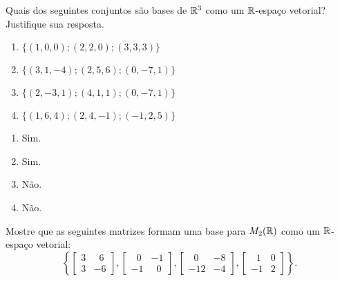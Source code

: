 \documentclass[12pt]{exam}
\begin{document}
    \begin{exercicio}
        Quais dos seguintes conjuntos são bases de $\mathbb{R}^3$ como um $\mathbb{R}$-espaço vetorial? Justifique sua resposta.
        \begin{multicols}{2}
            \begin{enumerate}[label={\alph*})]
                \item $\{(1, 0, 0); (2, 2, 0); (3, 3, 3)\}$
            
                \item $\{(3, 1, -4); (2, 5, 6); (0, -7, 1)\}$
            
                \item $\{(2, -3, 1); (4, 1, 1); (0, -7, 1)\}$
            
                \item $\{(1, 6, 4); (2, 4, -1); (-1, 2, 5)\}$
            \end{enumerate}
        \end{multicols}
        \begin{solucao}
            \begin{enumerate}[label={\alph*})]
                \item Sim.

                \item Sim.

                \item Não.

                \item Não.
            \end{enumerate}
        \end{solucao}
    \end{exercicio}

    \begin{exercicio}
        Mostre que as seguintes matrizes formam uma base para $M_2(\mathbb{R})$ como um $\mathbb{R}$-espaço vetorial:
        \[
            \left\{
                \begin{bmatrix}
                    3 & \phantom{x} 6\\
                    3 & -6
                \end{bmatrix},
                \begin{bmatrix}
                    \phantom{x} 0 & -1\\
                    -1 & \phantom{x} 0
                \end{bmatrix},
                \begin{bmatrix}
                    \phantom{x} 0 & -8\\
                    -12 & -4
                \end{bmatrix},
                \begin{bmatrix}
                    \phantom{x} 1 & 0\\
                    -1 & 2
                \end{bmatrix}
            \right\}.
        \]
    \end{exercicio}
\end{document}
